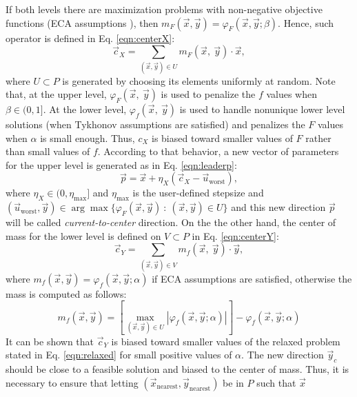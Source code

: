 \documentclass[conference]{IEEEtran}
\theoremstyle{definition}
\begin{document}
If both levels there are maximization problems with non-negative objective functions
(ECA assumptions \cite{Mejia2018}), then $m_F(\vec{x}, \vec{y}) = \varphi_F (\vec{x}, \vec{y}; \beta)$.
Hence, such operator is defined in Eq. \ref{eqn:centerX}:
% 
\begin{equation}
    \vec{c}_X = \sum_{(\vec{x}, \vec{y})\in U} m_F(\vec{x},\ \vec{y}) \cdot \vec{x},
    \label{eqn:centerX}
\end{equation}
% 
where $U \subset P$ is generated by choosing its elements uniformly at random.
Note that, at the upper level, $\varphi_F (\vec{x},\ \vec{y})$ is used to penalize
the $f$ values when $\beta\in (0, 1]$. At the lower level, $\varphi_f (\vec{x},\ \vec{y})$
is used to handle nonunique lower level solutions (when Tykhonov assumptions are 
satisfied) and penalizes the $F$ values when $\alpha$ is small enough. Thus, $c_X$
is biased toward smaller values of $F$ rather than small values of $f$. According
to that behavior, a new vector of parameters for the upper level is generated as
in Eq. \ref{eqn:leaderp}:
% 
\begin{equation}
    \vec{p} = \vec{x} + \eta_{X} (\vec{c}_X - \vec{u}_{\text{worst}}),
    \label{eqn:leaderp}
\end{equation}
% 
where $\eta_{X} \in (0, \eta_{\max}]$ and $\eta_{\max}$ is the user-defined stepsize and  
$
    (\vec{u}_{\text{worst}}, \vec{y}) \in \arg \max \{\varphi_F(\vec{x}, \vec{y} )  \ : \ (\vec{x}, \vec{y}) \in U \} 
$ %
% 
and this new direction $\vec{p}$ will be called \textit{current-to-center} direction. %
On the the other hand, the center of mass for the lower level is defined on
$V \subset P$ in Eq. \ref{eqn:centerY}:
% 
\begin{equation}
    \vec{c}_Y = \sum_{(\vec{x}, \vec{y})\in V} m_f(\vec{x},\ \vec{y}) \cdot \vec{y},
    \label{eqn:centerY}
\end{equation}
% 
where $m_f(\vec{x}, \vec{y}) = \varphi_f(\vec{x}, \vec{y}; \alpha )$ if ECA assumptions
are satisfied, otherwise the mass is computed as follows:
% 
\[
    m_f(\vec{x}, \vec{y}) =
        \left[ \max_{(\vec{x}, \vec{y})\in U} |\varphi_f (\vec{x}, \vec{y}; \alpha)| \right]
        - \varphi_f (\vec{x}, \vec{y}; \alpha)
\]
% 
It can be shown that $\vec{c}_Y$ is biased toward smaller values of the relaxed
problem stated in Eq. \ref{eqn:relaxed} for small positive values of $\alpha$.
% 
The new direction $\vec{y}_c$ should be close to a feasible solution and biased
to the center of mass. Thus, it is necessary to ensure that letting
$(\vec{x}_\text{nearest}, \vec{y}_{\text{nearest}}) $ be in $P$ such that $\vec{x}$
\end{document}
